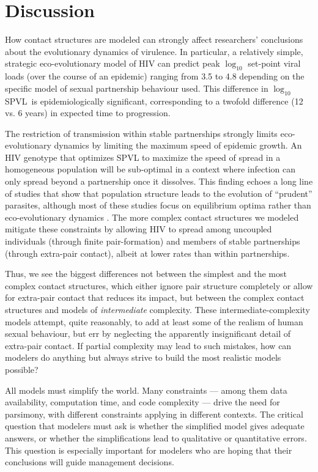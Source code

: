 \documentclass[10pt,letterpaper]{article}
\newcommand{\Lspvl}{$\log_{10}$ SPVL}
\begin{document}
\section*{Discussion}

How contact structures are modeled can strongly affect
researchers' conclusions about the evolutionary dynamics of
virulence. In particular, a relatively simple, strategic
eco-evolutionary model of HIV can predict peak $\log_{10}$
set-point viral loads (over the course of an epidemic)
ranging from 3.5 to 4.8 depending on the specific model
of sexual partnership behaviour used. This difference in \Lspvl\ is
epidemiologically significant, corresponding to a twofold difference
(12 vs. 6 years) in expected time to progression.

The restriction of transmission within stable partnerships
strongly limits eco-evolutionary dynamics by
limiting the maximum speed of epidemic growth. An HIV genotype
that optimizes SPVL to maximize the speed of spread in
a homogeneous population will be sub-optimal in a context
where infection can only spread beyond a partnership once
it dissolves. This finding echoes a long line of
studies that show that population structure leads to the
evolution of ``prudent'' parasites, although most of these studies
focus on equilibrium optima rather than eco-evolutionary dynamics
\cite{Herre1995,Kerr+2006,webb_theoretical_2013,berngruber_spatial_2015}. 
The more complex contact structures we modeled
mitigate these constraints by allowing HIV to spread among uncoupled individuals (through finite pair-formation) and members of stable partnerships
(through extra-pair contact), albeit at lower rates than within
partnerships.

Thus, we see the biggest differences not between the simplest
and the most complex contact structures, which either
ignore pair structure completely or allow for extra-pair
contact that reduces its impact, but between the
complex contact structures and models of \emph{intermediate}
complexity. These intermediate-complexity models attempt,
quite reasonably, to add at least some of the realism of
human sexual behaviour, but err by neglecting the apparently insignificant
detail of extra-pair contact. If partial complexity
may lead to such mistakes, how can modelers do anything but always
strive to build the most realistic models possible?

All models must simplify the world.  Many constraints --- among them data
availability, computation time, and code complexity --- drive the need
for parsimony, with different constraints applying in different
contexts. The critical question that modelers must ask is whether the
simplified model gives adequate answers, or whether the
simplifications lead to qualitative or quantitative errors.
This question is especially important for modelers who
are hoping that their conclusions will guide management decisions.
\end{document}
